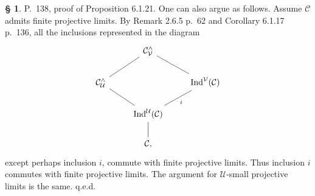 \documentclass[12pt]{article}%
\newtheorem{prop}[thm]{Proposition}
\newtheorem{nota}[thm]{Notation}
\theoremstyle{remark}
\theoremstyle{definition}
\newtheorem{s}[thm]{\S}%
\newcommand{\C}{\mathcal C}
\newcommand{\U}{\mathcal U}
\newcommand{\V}{\mathcal V}
\DeclareMathOperator*{\colim}{colim}
\DeclareMathOperator{\id}{id}
\DeclareMathOperator{\Ind}{Ind}
\begin{document}
%

\begin{s} 
P.~138, proof of Proposition 6.1.21. One can also argue as follows. Assume $\C$ admits finite projective limits. By Remark 2.6.5 p.~62 and Corollary 6.1.17 p.~136, all the inclusions represented in the diagram 
\[
\begin{tikzcd}
{}&\C^\wedge_\V\ar[-]{ld}\ar[-]{rd}\\
\C^\wedge_\U\ar[-]{rd}&&\Ind^\V(\C)\ar[-]{ld}{i}\\
&\Ind^\U(\C)\ar[-]{d}\\
&\C,
\end{tikzcd}
\]
except perhaps inclusion $i$, commute with finite projective limits. Thus inclusion $i$ commutes with finite projective limits. The argument for $\U$-small projective limits is the same. q.e.d.
\end{s}

%



%

\end{document}
